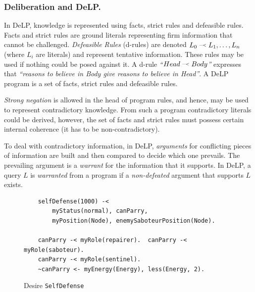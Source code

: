 \subsubsection{Deliberation and DeLP.}
    \newcommand{\drule}[2]{\mbox{$ #1\; \defleftarrow \; #2$}}
    \newcommand{\defleftarrow}{{\raise1.5pt\hbox{\tiny\defleft}}}
    \newcommand{\defleft}{\mbox{---\hspace{-1.5pt}\raise.05pt\hbox{$<$}}}
    In DeLP\cite{Garcia:2004a}, knowledge is represented using facts, strict rules
    and defeasible rules. Facts and strict rules are ground literals representing
    firm information that cannot be challenged. \textit{Defeasible Rules}
    (d-rules) are denoted $\drule{L_0}{L_1, \ldots, L_n}$ (where $L_i$ are literals)
    and represent tentative information. These rules may be used if nothing could
    be posed against it. A d-rule \textit{``\drule{Head}{Body}''} expresses that
    \textit{``reasons to believe in Body give reasons to believe in Head''}. A DeLP
    program is a set of facts, strict rules and defeasible rules. 

    {\it Strong negation} is allowed in the head of program rules, and hence, may
    be used to represent contradictory knowledge. From such a program contradictory
    literals could be derived, however,  the set of facts and strict rules must
    possess certain internal coherence (it has to be non-contradictory). 

    To deal with contradictory information, in DeLP, \emph{arguments} for
    conflicting pieces of information are built and then compared to decide
    which one prevails. The prevailing argument is a \emph{warrant} for the
    information that it supports.  In DeLP, a query $L$ is \emph{warranted} from
    a program if a \emph{non-defeated} argument that supports $L$ exists. %
    
    \begin{figure}
    \begin{small}
    \begin{Verbatim}
    selfDefense(1000) -<
        myStatus(normal), canParry,
        myPosition(Node), enemySaboteurPosition(Node).  

    canParry -< myRole(repairer).  canParry -< myRole(saboteur).
    canParry -< myRole(sentinel).  
    ~canParry <- myEnergy(Energy), less(Energy, 2). 
    \end{Verbatim}
    \end{small}
    \caption{Desire \texttt{SelfDefense}}
    \label{fig:SelfDefense}
    \end{figure}
    
